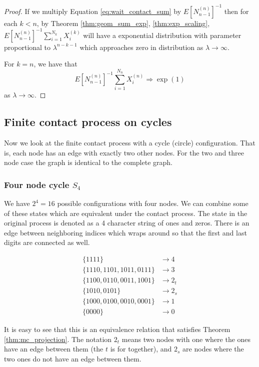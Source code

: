 \documentclass{article}
\theoremstyle{plain}
\theoremstyle{definition}
\theoremstyle{remark}
\numberwithin{equation}{section}
\begin{document}
\begin{proof}
If we multiply Equation \eqref{eq:wait_contact_sum} by $E[N_{n-1}^{(n)}]^{-1}$ then for each $k < n$, by Theorem \eqref{thm:geom_sum_exp}, \eqref{thm:exp_scaling}, $E[N_{n-1}^{(n)}]^{-1} \sum_{i =
1}^{N_{k}} X_i^{(k)}$ will have a exponential distribution with parameter proportional to $\lambda^{n - k - 1}$ which approaches zero in distribution as $\lambda \to \infty$.

For $k = n$, we have that
$$
E[N_{n-1}^{(n)}]^{-1} \sum_{i =
1}^{N_{n}} X_i^{(n)} \Rightarrow \exp(1)
$$
as $\lambda \to \infty$.
\end{proof}

\subsection{Finite contact process on cycles}

Now we look at the finite contact process with a cycle (circle) configuration.
That is, each node has an edge with exactly two other nodes.
For the two and three node case the graph is identical to the complete graph.

\subsubsection{Four node cycle \texorpdfstring{$S_4$}{S4}}
We have $2^4 = 16$ possible configurations with four nodes.
We can combine some of these states which are equivalent under the contact process.
The state in the original process is denoted as a 4 character string of ones and zeros.
There is an edge between neighboring indices which wraps around so that the first and last digits are connected as well.

\begin{align*}
    \{1111\} &\to 4\\
    \{1110, 1101, 1011, 0111\} &\to 3\\
    \{1100, 0110, 0011, 1001\} &\to 2_t\\
    \{1010, 0101\} &\to 2_s\\
    \{1000, 0100, 0010, 0001\} &\to 1\\
    \{0000\} &\to 0
\end{align*}

It is easy to see that this is an equivalence relation that satisfies Theorem \ref{thm:mc_projection}.
The notation $2_t$ means two nodes with one where the ones have an edge between them (the $t$ is for together),
and $2_s$ are nodes where the two ones do not have an edge between them.
\end{document}
